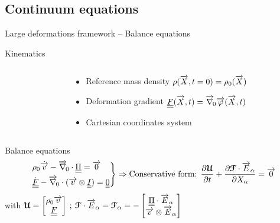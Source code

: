 \subsection{Continuum equations}

\begin{frame}{Large deformations framework -- Balance equations}
  \begin{footnotesize}
    \begin{block}{Kinematics}
      \begin{columns}
        \begin{column}{0.45\textwidth}
          
        \end{column}
        \begin{column}{0.5\textwidth}
          \begin{itemize}
          \item Reference mass density $\rho({\overrightarrow{X}},t=0)=\rho_0({\overrightarrow{X}})$
          \item Deformation gradient ${\underline{\underline{F}}}({\overrightarrow{X}},t)={\overrightarrow{\nabla}}_{\!0}{\overrightarrow{\varphi}}({\overrightarrow{X}},t)$
          \item Cartesian coordinates system
          \end{itemize}
        \end{column}
      \end{columns}
    \end{block}
    \begin{block}{Balance equations \cite{Plohr}}
      \begin{equation*}
        \left.\begin{aligned}
            & \rho_0 \dot{{\overrightarrow{v}}} - {\overrightarrow{\nabla}}_{\!0} \cdot {\underline{\underline{\Pi}}} = {\overrightarrow{0}} \\
            & \dot{{\underline{\underline{F}}}} - {\overrightarrow{\nabla}}_{\!0} \cdot ({\overrightarrow{v}} \otimes {\underline{\underline{I}}})= {\underline{\underline{0}}}
          \end{aligned}\right\rbrace \Rightarrow \text{Conservative form: } \frac{\partial {\boldsymbol{\mathcal{U}}}}{\partial t} + \frac{\partial {\boldsymbol{\mathcal{F}}}\cdot{\overrightarrow{E}}_\alpha}{\partial X_\alpha} = {\overrightarrow{0}}
      \end{equation*}
      with ${\boldsymbol{\mathcal{U}}} = \left[\begin{matrix}\rho_0{\overrightarrow{v}} \\ {\underline{\underline{F}}}\end{matrix}\right] \: ; \: {\boldsymbol{\mathcal{F}}}\cdot{\overrightarrow{E}}_\alpha={\boldsymbol{\mathcal{F}}}_\alpha=-\left[\begin{matrix}{\underline{\underline{\Pi}}}\cdot{\overrightarrow{E}}_\alpha\\ {\overrightarrow{v}} \otimes{\overrightarrow{E}}_\alpha\end{matrix}\right]$
    \end{block}
  \end{footnotesize}
\end{frame}

